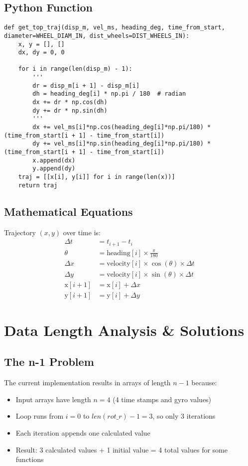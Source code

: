 \documentclass{article}
\begin{document}
\subsection{Python Function}
\begin{lstlisting}
def get_top_traj(disp_m, vel_ms, heading_deg, time_from_start, diameter=WHEEL_DIAM_IN, dist_wheels=DIST_WHEELS_IN):
    x, y = [], []
    dx, dy = 0, 0

    for i in range(len(disp_m) - 1):
        '''
        dr = disp_m[i + 1] - disp_m[i]
        dh = heading_deg[i] * np.pi / 180  # radian
        dx += dr * np.cos(dh)
        dy += dr * np.sin(dh)
        '''
        dx += vel_ms[i]*np.cos(heading_deg[i]*np.pi/180) * (time_from_start[i + 1] - time_from_start[i])
        dy += vel_ms[i]*np.sin(heading_deg[i]*np.pi/180) * (time_from_start[i + 1] - time_from_start[i])
        x.append(dx)
        y.append(dy)
    traj = [[x[i], y[i]] for i in range(len(x))]
    return traj
\end{lstlisting}

\subsection{Mathematical Equations}
Trajectory $(x, y)$ over time is:
\begin{align*}
\Delta t &= t_{i+1} - t_i \\
\theta &= \text{heading}[i] \times \frac{\pi}{180} \\
\Delta x &= \text{velocity}[i] \times \cos(\theta) \times \Delta t \\
\Delta y &= \text{velocity}[i] \times \sin(\theta) \times \Delta t \\
\text{x}[i+1] &= \text{x}[i] + \Delta x \\
\text{y}[i+1] &= \text{y}[i] + \Delta y
\end{align*}

\section{Data Length Analysis \& Solutions}

\subsection{The n-1 Problem}
The current implementation results in arrays of length $n-1$ because:
\begin{itemize}
\item Input arrays have length $n = 4$ (4 time stamps and gyro values)
\item Loop runs from $i = 0$ to $len(rot\_r) - 1 = 3$, so only 3 iterations
\item Each iteration appends one calculated value
\item Result: 3 calculated values + 1 initial value = 4 total values for some functions
\end{itemize}
\end{document}
